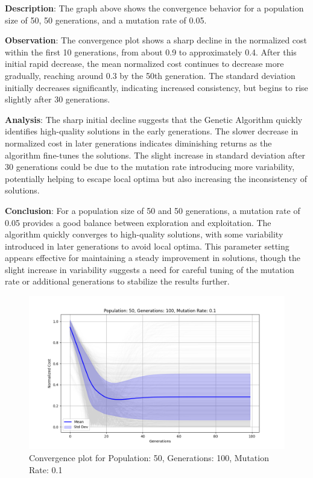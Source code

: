 \documentclass[
]{article}
\begin{document}
    \textbf{Description}: The graph above shows the convergence behavior for a population size of 50, 50 generations, and a mutation rate of 0.05.

    \textbf{Observation}: The convergence plot shows a sharp decline in the normalized cost within the first 10 generations, from about 0.9 to approximately 0.4. After this initial rapid decrease, the mean normalized cost continues to decrease more gradually, reaching around 0.3 by the 50th generation. The standard deviation initially decreases significantly, indicating increased consistency, but begins to rise slightly after 30 generations.

    \textbf{Analysis}: The sharp initial decline suggests that the Genetic Algorithm quickly identifies high-quality solutions in the early generations. The slower decrease in normalized cost in later generations indicates diminishing returns as the algorithm fine-tunes the solutions. The slight increase in standard deviation after 30 generations could be due to the mutation rate introducing more variability, potentially helping to escape local optima but also increasing the inconsistency of solutions.

    \textbf{Conclusion}: For a population size of 50 and 50 generations, a mutation rate of 0.05 provides a good balance between exploration and exploitation. The algorithm quickly converges to high-quality solutions, with some variability introduced in later generations to avoid local optima. This parameter setting appears effective for maintaining a steady improvement in solutions, though the slight increase in variability suggests a need for careful tuning of the mutation rate or additional generations to stabilize the results further.

    \begin{figure}[H]
        \centering
        \includegraphics[width=\textwidth]{genetic_algorithm/Population_50_Generations_100_MutationRate_0.1}
        \caption{Convergence plot for Population: 50, Generations: 100, Mutation Rate: 0.1}
        \label{fig:ga_50_100_1}
    \end{figure}
\end{document}
